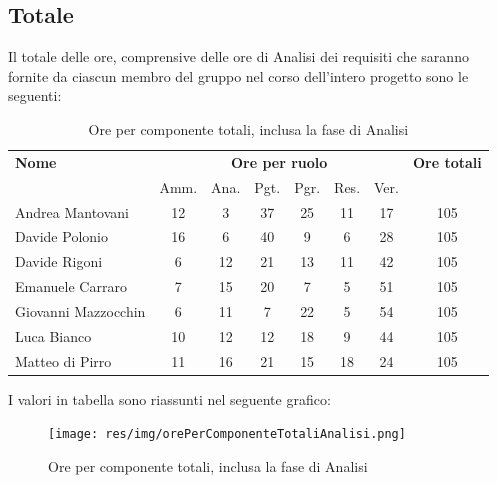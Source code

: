     
    
\pagebreak
\subsection{Totale}
Il totale delle ore, comprensive delle ore di Analisi dei requisiti che saranno fornite da ciascun membro
del gruppo nel corso dell’intero progetto sono le seguenti:

\begin{table}[H]
\begin{tabular}{lccccccc}
\toprule
    \textbf{Nome}  & \multicolumn{6}{c}{\textbf{Ore per ruolo}} & \textbf{Ore totali} \\
     & Amm. & Ana. & Pgt. & Pgr. & Res. & Ver. & \\
    \midrule
    
	   Andrea Mantovani & 12 & 3 & 37 & 25 & 11 & 17 & 105 \\
         Davide Polonio & 16 & 6 & 40 & 9 & 6 & 28 & 105 \\
       	  Davide Rigoni & 6 & 12 & 21 & 13 & 11 & 42 & 105 \\
	   Emanuele Carraro & 7 & 15 & 20 & 7 & 5 & 51 & 105 \\
	Giovanni Mazzocchin & 6 & 11 & 7 & 22 & 5 & 54 & 105 \\
	        Luca Bianco & 10 & 12 & 12 & 18 & 9 & 44 & 105 \\
      	Matteo di Pirro & 11 & 16 & 21 & 15 & 18 & 24 & 105 \\
   
    \bottomrule
\end{tabular}
\caption{Ore per componente totali, inclusa la fase di Analisi}
\end{table}

I valori in tabella sono riassunti nel seguente grafico: \\ 

    \begin{figure}[H]
      \begin{center}
        \texttt{[image: res/img/orePerComponenteTotaliAnalisi.png]}
      \caption{Ore per componente totali, inclusa la fase di Analisi}
      \end{center} 
    \end{figure}    
    
    
